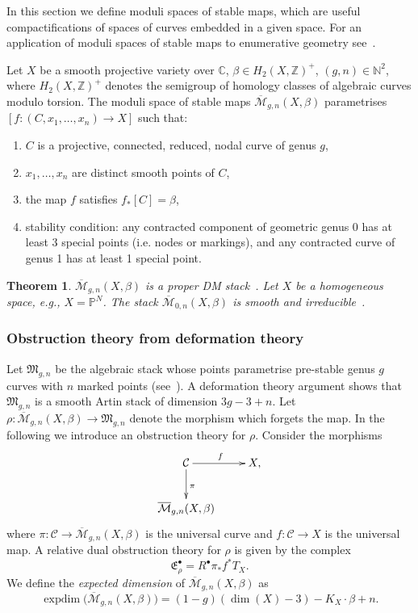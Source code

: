 \documentclass[pdftex]{sigma}
\numberwithin{equation}{section}
\newtheorem{Theorem}{Theorem}[section]
\newcommand{\E}{\mathfrak E}
\newcommand{\PP}{\mathbb P}
\newcommand{\MM}[4]{\overline{\mathcal M}_{#1,#2}(#3,#4)}
\theoremstyle{plain}
\theoremstyle{definition}
\theoremstyle{remark}
\begin{document}
In this section we define moduli spaces of stable maps, which are useful compactifications of spaces of curves embedded in a given space. For an application of moduli spaces of stable maps to enumerative geometry see~\cite{k}.
\begin{Definition}[\cite{k}] Let $X$ be a smooth projective variety over $\mathbb C$, $\beta\in H_2(X,\mathbb Z)^+$, $(g,n)\in\mathbb N^2$, where $H_2(X,\mathbb Z)^+$ denotes the semigroup of homology classes of algebraic curves modulo torsion. The moduli space of stable maps $\MM{g}{n}{X}{\beta}$ parametrises $[f\colon (C,x_1,\ldots,x_n)\to X]$ such that:
\begin{enumerate}\itemsep=0pt
\item[(1)] $C$ is a projective, connected, reduced, nodal curve of genus $g$,
\item[(2)] $x_1,\ldots,x_n$ are distinct smooth points of $C$,
\item[(3)] the map $f$ satisfies $f_*[C]=\beta$,
\item[(4)] stability condition: any contracted component of geometric genus 0 has at least 3 special points (i.e. nodes or markings), and any contracted curve of genus 1 has at least 1 special point.
\end{enumerate}
\end{Definition}

\begin{Theorem}
 $\MM{g}{n}{X}{\beta}$ is a proper DM stack~{\rm \cite{k}}. Let $X$ be a homogeneous space, e.g., $X=\PP^N$. The stack $\MM{0}{n}{X}{\beta}$ is smooth and irreducible~{\rm \cite{FP}}.
\end{Theorem}

\subsubsection{Obstruction theory from deformation theory} \label{obsdefth}
Let $\mathfrak M_{g,n}$ be the algebraic stack whose points parametrise pre-stable genus $g$ curves with $n$ marked points (see~\cite{Ber}). A deformation theory argument shows that $\mathfrak M_{g,n}$ is a smooth Artin stack of dimension $3g-3+n$. Let $\rho\colon \MM{g}{n}{X}{\beta}\to \mathfrak M_{g,n}$ denote the morphism which forgets the map. In the following we introduce an obstruction theory for $\rho$.
Consider the morphisms
\[\xymatrix{\mathcal C\ar[r]^f\ar[d]^{\pi} & X,\\
				\overline{\mathcal{M}}_{g,n}(X,\beta)}\]
where $\pi\colon \mathcal C\to \MM{g}{n}{X}{\beta}$ is the universal curve and $f\colon \mathcal{C}\to X$ is the universal map.
A relative dual obstruction theory for $\rho$ is given by the complex
\begin{equation}\label{mapsobs}\E^{\bullet}_{\rho}=R^{\bullet}\pi_* f^*T_X.
\end{equation}
We define the \emph{expected dimension} of $\MM{g}{n}{X}{\beta}$ as
\[
 \operatorname{expdim}\big(\MM{g}{n}{X}{\beta}\big)=(1-g)(\dim(X)-3)-K_X\cdot\beta+n.
\]
\end{document}
